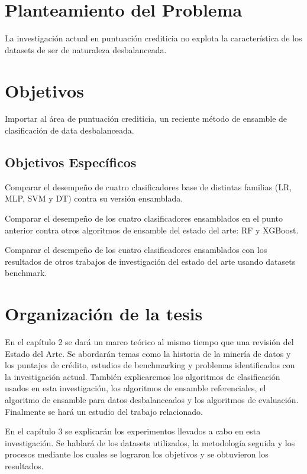\section{Planteamiento del Problema}

La investigación actual en puntuación crediticia no explota la característica de los datasets de ser de naturaleza desbalanceada.

\section{Objetivos}

Importar al área de puntuación crediticia, un reciente método de ensamble de clasificación de data desbalanceada.

\subsection{Objetivos Específicos}

Comparar el desempeño de cuatro clasificadores base de distintas familias (\ac{LR}, \ac{MLP}, \ac{SVM} y \ac{DT}) contra su versión ensamblada.

Comparar el desempeño de los cuatro clasificadores ensamblados en el punto anterior contra otros algoritmos de ensamble del estado del arte: \ac{RF} y \ac{XGBoost}.

Comparar el desempeño de los cuatro clasificadores ensamblados con los resultados de otros trabajos de investigación del estado del arte usando datasets benchmark.

\section{Organización de la tesis}

En el capítulo 2 se dará un marco teórico al mismo tiempo que una revisión del Estado del Arte. Se abordarán temas como la historia de la minería de datos y los puntajes de crédito, estudios de benchmarking y problemas identificados con la investigación actual. También explicaremos los algoritmos de clasificación usados en esta investigación, los algoritmos de ensamble referenciales, el algoritmo de ensamble para datos desbalanceados y los algoritmos de evaluación. Finalmente se hará un estudio del trabajo relacionado.

En el capítulo 3 se explicarán los experimentos llevados a cabo en esta investigación. Se hablará de los datasets utilizados, la metodología seguida y los procesos mediante los cuales se lograron los objetivos y se obtuvieron los resultados.

